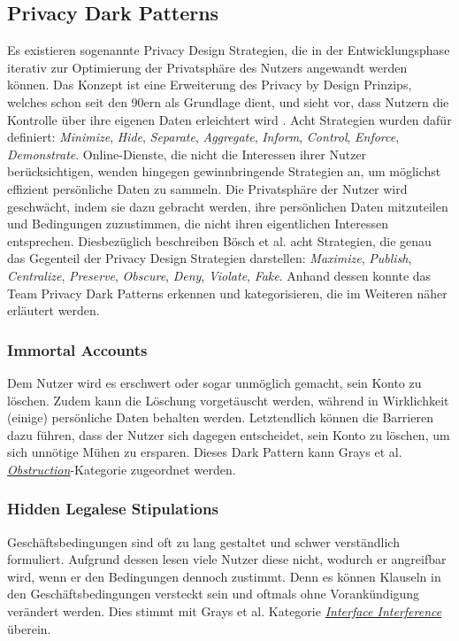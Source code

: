 \documentclass[a4paper]{article}
\begin{document}
\subsection{Privacy Dark Patterns}
\label{sub:privacy_dark_patterns}
Es existieren sogenannte Privacy Design Strategien, die in der Entwicklungsphase iterativ zur Optimierung der Privatsphäre des Nutzers angewandt werden können. Das Konzept ist eine Erweiterung des Privacy by Design Prinzips, welches schon seit den 90ern als Grundlage dient, und sieht vor, dass Nutzern die Kontrolle über ihre eigenen Daten erleichtert wird \cite{boesch}. Acht Strategien wurden dafür definiert: \textit{Minimize}, \textit{Hide}, \textit{Separate}, \textit{Aggregate}, \textit{Inform}, \textit{Control}, \textit{Enforce}, \textit{Demonstrate}.\newline
Online-Dienste, die nicht die Interessen ihrer Nutzer berücksichtigen, wenden hingegen gewinnbringende Strategien an, um möglichst effizient persönliche Daten zu sammeln. Die Privatsphäre der Nutzer wird geschwächt, indem sie dazu gebracht werden, ihre persönlichen Daten mitzuteilen und Bedingungen zuzustimmen, die nicht ihren eigentlichen Interessen entsprechen. Diesbezüglich beschreiben Bösch et al. acht Strategien, die genau das Gegenteil der Privacy Design Strategien darstellen: 
\textit{Maximize}, \textit{Publish}, \textit{Centralize}, \textit{Preserve}, \textit{Obscure}, \textit{Deny}, \textit{Violate}, \textit{Fake}. Anhand dessen konnte das Team Privacy Dark Patterns erkennen und kategorisieren, die im Weiteren näher erläutert werden.

\subsubsection{Immortal Accounts}
\label{sssec:immortal_accounts}
Dem Nutzer wird es erschwert oder sogar unmöglich gemacht, sein Konto zu löschen. Zudem kann die Löschung vorgetäuscht werden, während in Wirklichkeit (einige) persönliche Daten behalten werden. Letztendlich können die Barrieren dazu führen, dass der Nutzer sich dagegen entscheidet, sein Konto zu löschen, um sich unnötige Mühen zu ersparen.\newline
Dieses Dark Pattern kann Grays et al. \hyperref[sssec:obstruction]{\textit{Obstruction}}-Kategorie zugeordnet werden.

\subsubsection{Hidden Legalese Stipulations}
\label{sssec:hidden_legalese_stipulations}
Geschäftsbedingungen sind oft zu lang gestaltet und schwer verständlich formuliert. Aufgrund dessen lesen viele Nutzer diese nicht, wodurch er angreifbar wird, wenn er den Bedingungen dennoch zustimmt. Denn es können Klauseln in den Geschäftsbedingungen versteckt sein und oftmals ohne Vorankündigung verändert werden.\newline
Dies stimmt mit Grays et al. Kategorie \hyperref[sssec:interface_interference]{\textit{Interface Interference}} überein.
\end{document}
